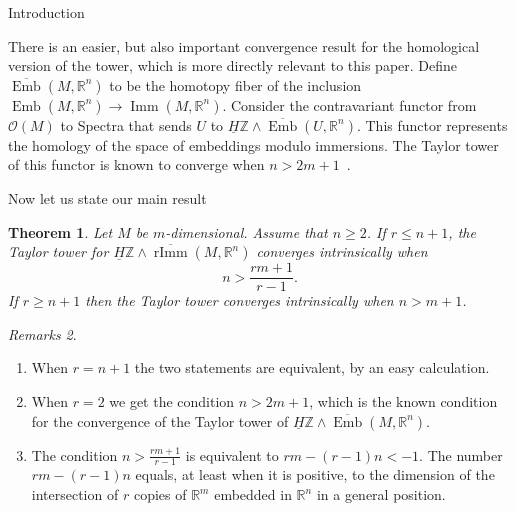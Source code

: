 \documentclass[12pt]{amsart}
\newcommand{\R}{{\mathbb R}}
\newcommand{\Z}{{\mathbb Z}}
\newcommand{\Emb}{\operatorname{Emb}}
\newcommand{\Ebar}{\overline{\Emb}}
\newcommand{\Imm}{\operatorname{Imm}}
\newcommand{\rImm}{\operatorname{rImm}}
\newcommand{\rbar}{\overline{\rImm}}
\newcommand{\HZ}{\underline{H}\Z}
\theoremstyle{plain}
\newtheorem{thm}{Theorem}[section]
\theoremstyle{definition}
\theoremstyle{remark}
\newtheorem{rems}[thm]{Remarks}
\begin{document}
\begin{section}{Introduction}

There is an easier, but also important convergence result for the homological version of the tower, which is more directly relevant to this paper. Define $\Ebar(M, \R^n)$ to be the homotopy fiber of the inclusion $\Emb(M, \R^n)\to \Imm(M, \R^n)$. Consider the contravariant functor from $\mathcal{O}(M)$ to Spectra that sends $U$ to $\underline{H}\mathbb Z\wedge \Ebar(U, \R^n)$. This functor represents the homology of the space of embeddings modulo immersions. The Taylor tower of this functor is known to converge when $n > 2m+1$~\cite{W:HomEmb}.

Now let us state our main result
\begin{thm}\label{thm: convergence} Let $M$ be $m$-dimensional. Assume that $n\ge 2$.
If $r\le n+1$, the Taylor tower for $\HZ \wedge \rbar(M, \R^n)$ converges intrinsically when
\[
n > \frac{rm+1}{r-1}.
\]
If $r\ge n+1$ then the Taylor tower converges intrinsically when $n> m+1$.
\end{thm}
\begin{rems}\hspace{10cm}
\begin{enumerate}
\item When $r=n+1$ the two statements are equivalent, by an easy calculation. %
\item When $r=2$ we get the condition $n>2m+1$, which is the known condition for the convergence of the Taylor tower of $\HZ\wedge \Ebar(M, \R^n)$.
\item The condition $n > \frac{rm+1}{r-1}$ is equivalent to $rm - (r-1)n < -1$. The number $rm - (r-1)n$ equals, at least when it is positive, to the dimension of the intersection of $r$ copies of $\R^m$ embedded in $\R^n$ in a general position.
\end{enumerate}
\end{rems}






\end{section}
\end{document}
